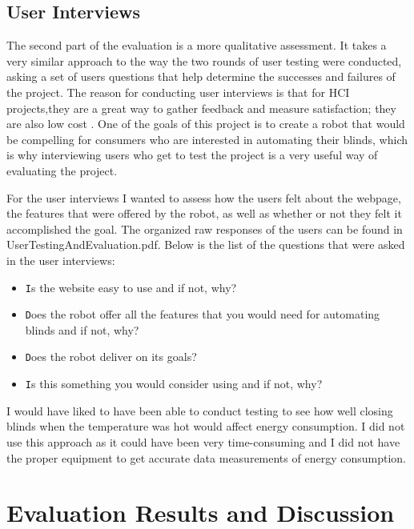 \documentclass[10pt,twocolumn]{article}
\begin{document}
\subsection{User Interviews}
The second part of the evaluation is a more qualitative assessment. It takes a very similar approach to the way the two rounds of user testing were conducted, asking a set of users questions that help determine the successes and failures of the project. The reason for conducting user interviews is that for HCI projects,they are a great way to gather feedback and measure satisfaction; they are also low cost \cite{Muler2016Designing}. One of the goals of this project is to create a robot that would be compelling for consumers who are interested in automating their blinds, which is why interviewing users who get to test the project is a very useful way of evaluating the project. 

For the user interviews I wanted to assess how the users felt about the webpage, the features that were offered by the robot, as well as whether or not they felt it accomplished the goal. The organized raw responses of the users can be found in UserTestingAndEvaluation.pdf. Below is the list of the questions that were asked in the user interviews:

\begin{itemize}
    \item \texttt Is the website easy to use and if not, why?
    \item \texttt Does the robot offer all the features that you would need for automating blinds and if not, why?
    \item \texttt Does the robot deliver on its goals?
    \item \texttt Is this something you would consider using and if not, why?
\end{itemize}

I would have liked to have been able to conduct testing to see how well closing blinds when the temperature was hot would affect energy consumption. I did not use this approach as it could have been very time-consuming and I did not have the proper equipment to get accurate data measurements of energy consumption.

\section{Evaluation Results and Discussion}
\end{document}
